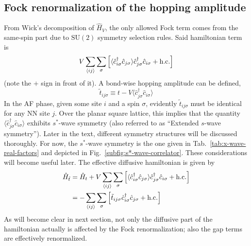 \subsection{Fock renormalization of the hopping amplitude}\label{subsec:fock-renormalization-hopping-amplitude}

From Wick's decomposition of $\hat H_V$, the only allowed Fock term comes from the same-spin part due to $\mathrm{SU}(2)$ symmetry selection rules. Said hamiltonian term is
\begin{equation}\label{eq:real-space-non-local-interaction-fock}
	V \sum_{\ev{ij}} \sum_\sigma \left[
		\langle
			\hat c_{i\sigma}^\dagger \hat c_{j\sigma}
		\rangle \hat c_{j\sigma}^\dagger  \hat c_{i\sigma} + \mathrm{h.c.}
	\right]
\end{equation}
(note the $+$ sign in front of it). A bond-wise hopping amplitude can be defined,
\[
	\tilde{t}_{ij\sigma} \equiv t - V \langle
		\hat c_{j\sigma}^\dagger \hat c_{i\sigma}
	\rangle
\]
In the AF phase, given some site $i$ and a spin $\sigma$, evidently $\tilde{t}_{ij\sigma}$ must be identical for any NN site $j$. Over the planar square lattice, this implies that the quantity $\langle
\hat c_{j\sigma}^\dagger \hat c_{i\sigma} \rangle$ exhibits $s^*$-wave symmetry (also referred to as ``Extended $s$-wave symmetry''). Later in the text, different symmetry structures will be discussed thoroughly. For now, the $s^*$-wave symmetry is the one given in Tab.~\ref{tab:x-wave-real-factors} and depicted in Fig.~\ref{subfig:s*-wave-correlator}. These considerations will become useful later. The effective diffusive hamiltonian is given by
\[
\begin{aligned}
	\hat H_{\tilde{t}} &= \hat H_t + V \sum_{\ev{ij}} \sum_\sigma \left[
		\langle
			\hat c_{i\sigma}^\dagger \hat c_{j\sigma}
		\rangle \hat c_{j\sigma}^\dagger  \hat c_{i\sigma} + \mathrm{h.c.}
	\right] \\
	&= - \sum_{\ev{ij}} \sum_\sigma 
	\left[
		\tilde{t}_{ij\sigma} \hat c_{i\sigma}^\dagger \hat c_{j\sigma} + \mathrm{h.c.}
	\right]
\end{aligned}
\]
As will become clear in next section, not only the diffusive part of the hamiltonian actually is affected by the Fock renormalization; also the gap terms are effectively renormalized.

